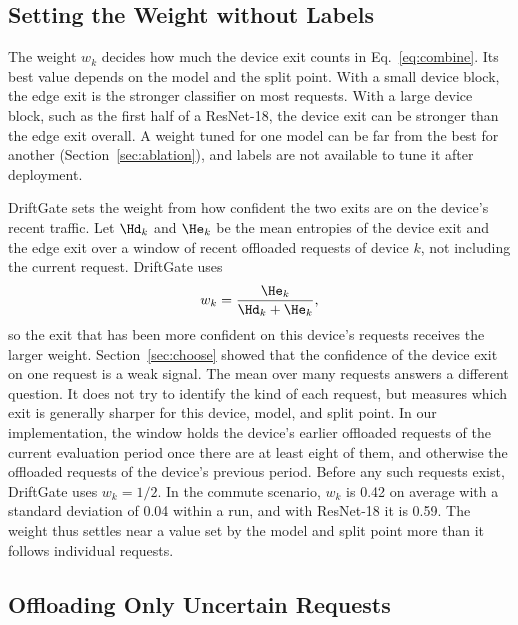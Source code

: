 \subsection{Setting the Weight without Labels}
\label{sec:weight}

The weight $w_k$ decides how much the device exit counts in Eq.~\eqref{eq:combine}. Its best value depends on the model and the split point. With a small device block, the edge exit is the stronger classifier on most requests. With a large device block, such as the first half of a ResNet-18, the device exit can be stronger than the edge exit overall. A weight tuned for one model can be far from the best for another (Section~\ref{sec:ablation}), and labels are not available to tune it after deployment.

DriftGate sets the weight from how confident the two exits are on the device's recent traffic. Let $\Hd_k$ and $\He_k$ be the mean entropies of the device exit and the edge exit over a window of recent offloaded requests of device $k$, not including the current request. DriftGate uses
\begin{equation}
w_k=\frac{\He_k}{\Hd_k+\He_k},
\label{eq:weight}
\end{equation}
so the exit that has been more confident on this device's requests receives the larger weight. Section~\ref{sec:choose} showed that the confidence of the device exit on one request is a weak signal. The mean over many requests answers a different question. It does not try to identify the kind of each request, but measures which exit is generally sharper for this device, model, and split point. In our implementation, the window holds the device's earlier offloaded requests of the current evaluation period once there are at least eight of them, and otherwise the offloaded requests of the device's previous period. Before any such requests exist, DriftGate uses $w_k=1/2$. In the commute scenario, $w_k$ is 0.42 on average with a standard deviation of 0.04 within a run, and with ResNet-18 it is 0.59. The weight thus settles near a value set by the model and split point more than it follows individual requests.

\subsection{Offloading Only Uncertain Requests}
\label{sec:offload}

